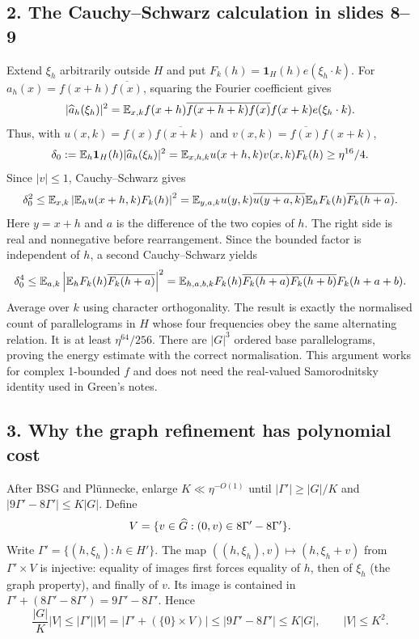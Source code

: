 \subsection*{2. The Cauchy--Schwarz calculation in slides 8--9}
Extend $\xi_h$ arbitrarily outside $H$ and put $F_k(h)=\mathbf1_H(h)e(\xi_h\cdot k)$.
For $a_h(x)=f(x+h)\overline{f(x)}$, squaring the Fourier coefficient gives
\[
|\widehat a_h(\xi_h)|^2
=\mathbb E_{x,k}f(x+h)\overline{f(x+h+k)}\overline{f(x)}f(x+k)e(\xi_h\cdot k).
\]
Thus, with $u(x,k)=f(x)\overline{f(x+k)}$ and
$v(x,k)=\overline{f(x)}f(x+k)$,
\[
\delta_0:=\mathbb E_h\mathbf1_H(h)|\widehat a_h(\xi_h)|^2
=\mathbb E_{x,h,k}u(x+h,k)v(x,k)F_k(h)\geq\eta^{16}/4.
\]
Since $|v|\leq1$, Cauchy--Schwarz gives
\[
\delta_0^2\leq
\mathbb E_{x,k}\left|\mathbb E_hu(x+h,k)F_k(h)\right|^2
=\mathbb E_{y,a,k}u(y,k)\overline{u(y+a,k)}
       \mathbb E_hF_k(h)\overline{F_k(h+a)}.
\]
Here $y=x+h$ and $a$ is the difference of the two copies of $h$.
The right side is real and nonnegative before rearrangement. Since the
bounded factor is independent of $h$, a second Cauchy--Schwarz yields
\[
\delta_0^4\leq
\mathbb E_{a,k}\left|\mathbb E_hF_k(h)\overline{F_k(h+a)}\right|^2
=\mathbb E_{h,a,b,k}F_k(h)\overline{F_k(h+a)}
                  \overline{F_k(h+b)}F_k(h+a+b).
\]
Average over $k$ using character orthogonality. The result is exactly the
normalised count of parallelograms in $H$ whose four frequencies obey the
same alternating relation. It is at least $\eta^{64}/256$. There are
$|G|^3$ ordered base parallelograms, proving the energy estimate with the
correct normalisation. This argument works for complex 1-bounded $f$ and
does not need the real-valued Samorodnitsky identity used in Green's notes.

\subsection*{3. Why the graph refinement has polynomial cost}
After BSG and Pl\"unnecke, enlarge $K\ll\eta^{-O(1)}$ until
$|\Gamma'|\geq |G|/K$ and $|9\Gamma'-8\Gamma'|\leq K|G|$.
Define
\[V=\{v\in\widehat G:(0,v)\in8\Gamma'-8\Gamma'\}.\]
Write $\Gamma'=\{(h,\xi_h):h\in H'\}$. The map
$((h,\xi_h),v)\mapsto(h,\xi_h+v)$ from $\Gamma'\times V$ is injective:
equality of images first forces equality of $h$, then of $\xi_h$ (the
graph property), and finally of $v$. Its image is contained in
$\Gamma'+(8\Gamma'-8\Gamma')=9\Gamma'-8\Gamma'$. Hence
\[\frac{|G|}{K}|V|\leq|\Gamma'||V|
=|\Gamma'+(\{0\}\times V)|\leq|9\Gamma'-8\Gamma'|\leq K|G|,
\qquad |V|\leq K^2.\]

